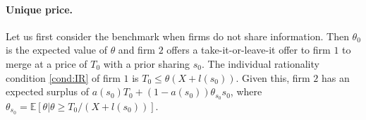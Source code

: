 \documentclass[a4paper]{article}
\newcommand{\E}{\mathbb E}
\renewcommand{\t}{\theta}
\begin{document}
\paragraph{Unique price.} Let us first consider the benchmark when firms do not share information. Then $\t_0$ is the expected value of $\t$ and firm $2$ offers a take-it-or-leave-it offer to firm $1$ to merge at a price of $T_0$ with a prior sharing $s_0$. The individual rationality condition \eqref{cond:IR} of firm $1$ is $T_0\leq \t (X+l(s_0))$. Given this, firm $2$ has an expected surplus of $a(s_0)T_0+(1-a(s_0))\theta_{s_0}s_0$, where $\theta_{s_0}=\E[\theta|\theta\geq T_0/(X+l(s_0))]$. 
%








\end{document}
